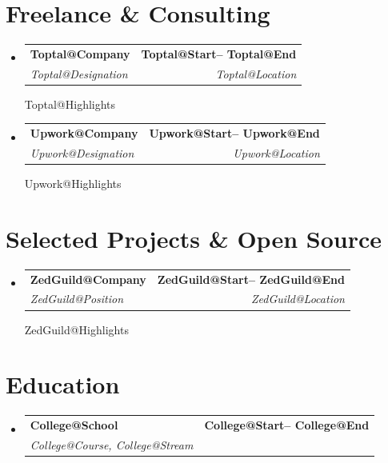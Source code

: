 \documentclass[letterpaper,11pt]{article}
\makeatletter
\newcommand{\resumeSubheading}[4]{
  \vspace{-1pt}\item
    \begin{tabular*}{1.0\textwidth}[t]{l@{\extracolsep{\fill}}r}
      \textbf{#1} & \textbf{#2} \\
      \textit{#3} & \textit{#4} \\
    \end{tabular*}\vspace{-5pt}
}
\newcommand{\resumeSubHeadingListStart}{\begin{itemize}[leftmargin=0.0in, label={}]}
\newcommand{\resumeSubHeadingListEnd}{\end{itemize}}
\newcommand{\renderExp}[1]{
\resumeSubheading
      {\csname #1@Company\endcsname}{\csname #1@Start\endcsname -- \csname #1@End\endcsname}
      {\csname #1@Designation\endcsname}{\csname #1@Location\endcsname}
      \csname #1@Highlights\endcsname
}
\newcommand{\renderProject}[1]{
    \resumeSubheading
      {\csname #1@Company\endcsname}
      {\csname #1@Start\endcsname -- \csname #1@End\endcsname}
      {\csname #1@Position\endcsname}
      {\csname #1@Location\endcsname}
    \csname #1@Highlights\endcsname
}
\makeatother
\begin{document}
\section{Freelance \& Consulting}
    \vspace{5pt}
    \resumeSubHeadingListStart
        \renderExp{Toptal}
        \vspace{5pt}
        \renderExp{Upwork}
    \resumeSubHeadingListEnd

\section{Selected Projects \& Open Source}
    \vspace{5pt}
    \resumeSubHeadingListStart
        \renderProject{ZedGuild}
    \resumeSubHeadingListEnd

\section{Education}
  \resumeSubHeadingListStart
      \resumeSubheading{\csname College@School\endcsname}
      {\csname College@Start\endcsname -- \csname College@End\endcsname}
      {\csname College@Course\endcsname, \csname College@Stream\endcsname}{ }
  \resumeSubHeadingListEnd
\end{document}
